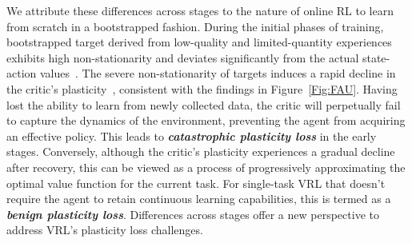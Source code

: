 \vspace{-0.5\baselineskip}

We attribute these differences across stages to the nature of online RL to learn from scratch in a bootstrapped fashion.
During the initial phases of training, bootstrapped target derived from low-quality and limited-quantity experiences exhibits high non-stationarity and deviates significantly from the actual state-action values~\citep{A-LIX}.
The severe non-stationarity of targets induces a rapid decline in the critic's plasticity~\citep{Enhancing_Generalization_Plasticity, Regulating_Overfitting}, consistent with the findings in Figure~\ref{Fig:FAU}.
Having lost the ability to learn from newly collected data, the critic will perpetually fail to capture the dynamics of the environment, preventing the agent from acquiring an effective policy.
This leads to \textbf{\textit{catastrophic plasticity loss}} in the early stages.
Conversely, although the critic's plasticity experiences a gradual decline after recovery, this can be viewed as a process of progressively approximating the optimal value function for the current task.
For single-task VRL that doesn't require the agent to retain continuous learning capabilities, this is termed as a \textbf{\textit{benign plasticity loss}}.
Differences across stages offer a new perspective to address VRL's plasticity loss challenges.



